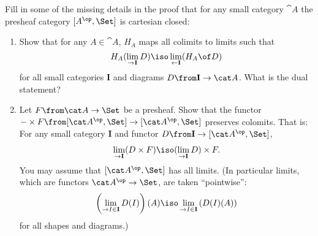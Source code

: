 
\begin{exercise}
  Fill in some of the missing details in the proof that for any small category $\cat A$ the presheaf category $[A^\op,\Set]$ is cartesian closed:
  \begin{enumerate}
  \item Show that for any $A\in\cat A$, $H_A$ maps all colimits to limits such that $$H_A(\lim_{\to\mathbf I} D)\iso \lim_{\leftarrow\mathbf I}(H_A\of D)$$ for all small categories $\mathbf I$ and diagrams $D\from \mathbf I\to\cat A$. What is the dual statement?
  \item Let $F\from \cat A\to\Set$ be a presheaf. Show that the functor $-\times F\from [\cat A^\op,\Set]\to[\cat A^\op,\Set]$ preserves colomits. That is: For any small category $\mathbf I$ and functor $D\from\mathbf I\to [\cat A^\op,\Set]$,
    \begin{align*}
      \lim_{\to \mathbf I} (D\times F)\iso (\lim_{\to \mathbf I} D)\times F.
    \end{align*}
    You may assume that $[\cat A^\op,\Set]$ has all limits. (In particular limits, which are functors $\cat A^\op\to\Set$, are taken ``pointwise'': $$\left(\lim_{\to I\in\mathbf I} D(I)\right)(A) \iso \lim_{\to I\in\mathbf I} \left(D(I)(A)\right)$$ for all shapes and diagrams.)
  \end{enumerate}
\end{exercise}



